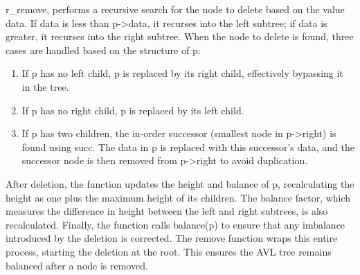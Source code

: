 \documentclass{report}
\begin{document}
\pagebreak \bigbreak \noindent 
r\_remove, performs a recursive search for the node to delete based on the value data. If data is less than p->data, it recurses into the left subtree; if data is greater, it recurses into the right subtree. When the node to delete is found, three cases are handled based on the structure of p:
\begin{enumerate}
    \item If p has no left child, p is replaced by its right child, effectively bypassing it in the tree.
    \item If p has no right child, p is replaced by its left child.
    \item If p has two children, the in-order successor (smallest node in p->right) is found using succ. The data in p is replaced with this successor’s data, and the successor node is then removed from p->right to avoid duplication.
\end{enumerate}
After deletion, the function updates the height and balance of p, recalculating the height as one plus the maximum height of its children. The balance factor, which measures the difference in height between the left and right subtrees, is also recalculated. Finally, the function calls balance(p) to ensure that any imbalance introduced by the deletion is corrected. The remove function wraps this entire process, starting the deletion at the root. This ensures the AVL tree remains balanced after a node is removed.

\pagebreak 
\end{document}
